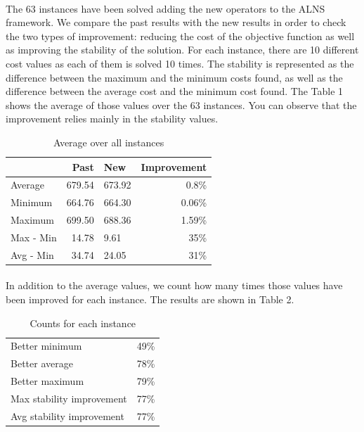 \documentclass[12pt,a4paper]{article}
\begin{document}
\paragraph{}
The 63 instances have been solved adding the new operators to the ALNS framework. We compare the past results with the new results in order to check the two types of improvement: reducing the cost of the objective function as well as improving the stability of the solution. For each instance, there are 10 different cost values as each of them is solved 10 times. The stability is represented as the difference between the maximum and the minimum costs found, as well as the difference between the average cost and the minimum cost found. The Table 1 shows the average of those values over the 63 instances. You can observe that the improvement relies mainly in the stability values. 

\begin{table}
\centering
\caption{Average over all instances}
\vspace{0.5em}
\begin{tabular}{lrlr}
	\hline
    & Past & New & Improvement\\
    \hline
    Average & 679.54 & 673.92 & 0.8\% \\
    Minimum & 664.76 & 664.30 & 0.06\% \\
    Maximum & 699.50 & 688.36 & 1.59\% \\
    Max - Min & 14.78 & 9.61 & 35\% \\
    Avg - Min & 34.74 & 24.05 & 31\% \\
    \hline
  \end{tabular}
\end{table}

\paragraph{}
In addition to the average values, we count how many times those values have been improved for each instance. The results are shown in Table 2.
\begin{table}
\caption{Counts for each instance}
\vspace{0.5em}
\centering
\begin{tabular}{lr}
      \hline
      Better minimum & 49\% \\
      Better average & 78\% \\
      Better maximum & 79\% \\
      Max stability improvement & 77\% \\
      Avg stability improvement & 77\% \\
      \hline
  \end{tabular}
\end{table}
\end{document}
